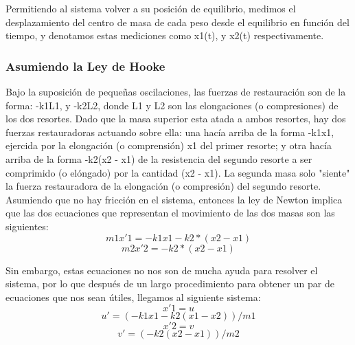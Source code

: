 \documentclass{article}
\begin{document}
Permitiendo al sistema volver a su posición de equilibrio, medimos el desplazamiento del centro de masa de cada peso desde el equilibrio en función del tiempo, y denotamos estas mediciones como x1(t), y x2(t) respectivamente.

\subsubsection {Asumiendo la Ley de Hooke}
Bajo la suposición de pequeñas oscilaciones, las fuerzas de restauración son de la forma: -k1L1, y -k2L2, donde L1 y L2 son las elongaciones (o compresiones) de los dos resortes. Dado que la masa superior esta atada a ambos resortes, hay dos fuerzas restauradoras actuando sobre ella: una hacía arriba de la forma -k1x1, ejercida por la elongación (o comprensión) x1 del primer resorte; y otra hacía arriba de la forma -k2(x2 - x1) de la resistencia del segundo resorte a ser comprimido (o elóngado) por la cantidad (x2 - x1). La segunda masa solo "siente" la fuerza restauradora de la elongación (o compresión) del segundo resorte.
Asumiendo que no hay fricción en el sistema, entonces la ley de Newton implica que las dos ecuaciones que representan el movimiento de las dos masas son las siguientes:
\begin{equation}
m1x'1 = -k1x1 - k2*(x2-x1)
\end{equation}
\begin{equation}
m2x'2 = - k2*(x2-x1)
\end{equation}

Sin embargo, estas ecuaciones no nos son de mucha ayuda para resolver el sistema, por lo que después de un largo procedimiento para obtener un par de ecuaciones que nos sean útiles, llegamos al siguiente sistema:
\begin{equation}
x'1 = u
\end{equation}
\begin{equation}
u' = (-k1x1 - k2(x1 - x2))/m1
\end{equation}
\begin{equation}
x'2 = v
\end{equation}
\begin{equation}
v' = (-k2(x2 -x1))/m2
\end{equation}
\end{document}
